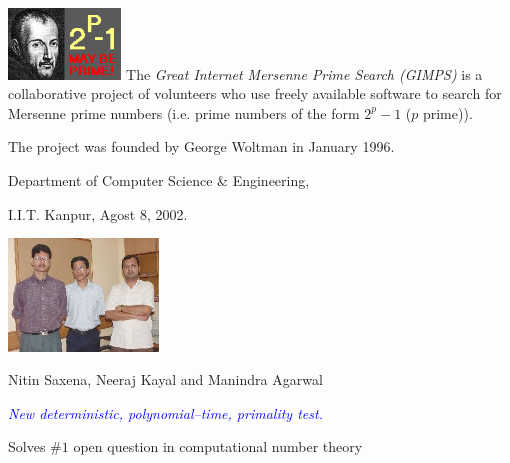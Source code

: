 \documentclass[landscape,display]{powersem} %
\newcommand{\heading}[1]{%
 \begin{center}
  \large\bf
  \shadowbox{{\textcolor{conceptcolor}{#1}}}%
 \end{center}
 \vspace{1ex minus 1ex}}
\begin{document}
\begin{slide}
\begin{itemize}
\end{itemize}

\end{slide}


\begin{slide}
\heading{Great Internet Mersenne Prime Search (GIMPS)}\pause

\includegraphics[width=3cm]{images/GIMPS_logo.png}
The \emph{Great Internet Mersenne Prime Search (GIMPS)} 
is a collaborative project of volunteers who use freely available software to search for Mersenne prime numbers
(i.e. prime numbers of the form $2^p-1$ ($p$ prime)). \pause

The project was founded by George Woltman in January 1996.


\end{slide}

\begin{slide}
\heading{The AKS deterministic primality test}\pause

\centerline{Department of Computer Science \& Engineering,}
\centerline{I.I.T. Kanpur, Agost 8, 2002.}\pause

\centerline{\includegraphics[width=4cm]{images/primality-group.jpg}}

\centerline{Nitin Saxena, Neeraj Kayal and Manindra Agarwal}\pause

\centerline{\textcolor{blue}{\emph{New deterministic,
polynomial--time, primality test.}}}\pause

Solves $\# 1$ open question in computational number theory\pause


\heading{http://www.cse.iitk.ac.in/news/primality.html}
\end{slide}
\end{document}
